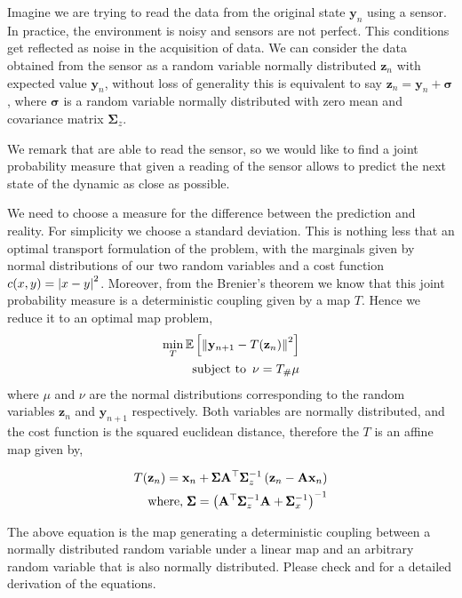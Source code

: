 Imagine we are trying to read the data from the original state $\mathbf{y}_n$ using a sensor. In practice, the environment is noisy and sensors are not perfect. This conditions get reflected as noise in the acquisition of data. We can consider the data obtained from the sensor as a random variable normally distributed $\mathbf{z}_n$ with expected value $\mathbf{y}_n$, without loss of generality this is equivalent to say $\mathbf{z}_n=\mathbf{y}_n+\pmb{\sigma}$, where $\pmb{\sigma}$ is a random variable normally distributed with zero mean and covariance matrix $\pmb{\Sigma}_z$. 
	
We remark that are able to read the sensor, so we would like to find a joint probability measure that given a reading of the sensor allows to predict the next state of the dynamic as close as possible. 

We need to choose a measure for the difference between the prediction and reality. For simplicity we choose a standard deviation. This is nothing less that an optimal transport formulation of the problem, with the marginals given by normal distributions of our two random variables and a cost function $c(x,y)=\left| x-y \right|^2$.  Moreover, from the Brenier's theorem we know that this joint probability measure is a deterministic coupling given by a map $T$.
Hence we reduce it to an optimal map problem, 
\begin{align}
\min_{T}\mathbb{E}\left[ \left\|\mathbf{y}_{n+1}-T(\mathbf{z}_n)\right\|^2 \right]\\
\text{subject to } \, \nu = {T}_{\#} \mu
\end{align}
where $\mu$ and $\nu$ are the normal distributions corresponding to the random variables $\mathbf{z}_n$ and $\mathbf{y}_{n+1}$ respectively. Both variables are normally distributed, and the cost function is the squared euclidean distance, therefore the $T$ is an affine map given by,

\begin{align}
	T(\mathbf{z}_{n})=\mathbf{x}_{n}+\pmb{\Sigma}\mathbf{A}^{\top}\pmb{\Sigma}_z^{-1}\left( \mathbf{z}_n-\mathbf{A}\mathbf{x}_{n} \right)\\
	\text{where, }\pmb{\Sigma}=\left( \mathbf{A}^\top \pmb{\Sigma}_z^{-1}\mathbf{A}+\pmb{\Sigma}_x^{-1} \right)^{-1} \nonumber
\end{align}

The above equation is the map generating a deterministic coupling between a normally distributed random variable under a linear map and an arbitrary random variable that is also normally distributed. Please check \cite{Tarek2012OTFilter} and \cite{Dean2014OTFilters} for a detailed derivation of the equations. 


